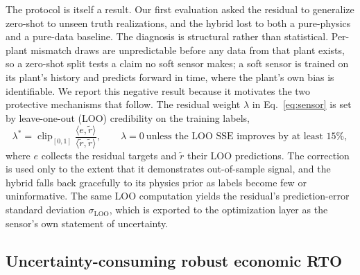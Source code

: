 The protocol is itself a result. Our first evaluation asked the
residual to generalize zero-shot to unseen truth realizations, and the
hybrid lost to both a pure-physics and a pure-data baseline. The
diagnosis is structural rather than statistical. Per-plant mismatch
draws are unpredictable before any data from that plant exists, so a
zero-shot split tests a claim no soft sensor makes; a soft sensor is
trained on its plant's history and predicts forward in time, where the
plant's own bias is identifiable. We report this negative result
because it motivates the two protective mechanisms that follow. The
residual weight $\lambda$ in Eq.~\eqref{eq:sensor} is set by
leave-one-out (LOO) credibility on the training labels,
\begin{equation}\label{eq:lambda}
\lambda^{\ast} = \operatorname{clip}_{[0,1]}
\frac{\langle e, \tilde r\rangle}{\langle \tilde r, \tilde r\rangle},
\qquad \lambda = 0 \ \text{unless the LOO SSE improves by at least } 15\%,
\end{equation}
where $e$ collects the residual targets and $\tilde r$ their LOO
predictions. The correction is used only to the extent that it
demonstrates out-of-sample signal, and the hybrid falls back gracefully
to its physics prior as labels become few or uninformative. The same
LOO computation yields the residual's prediction-error standard
deviation $\sigma_{\mathrm{LOO}}$, which is exported to the
optimization layer as the sensor's own statement of uncertainty.

\subsection{Uncertainty-consuming robust economic RTO}\label{sec:rto}

